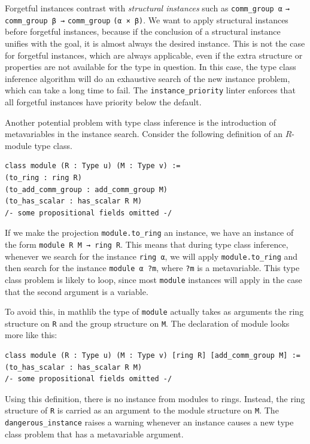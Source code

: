 \documentclass[runningheads]{llncs}
\newcommand{\mathlib}{\textsf{mathlib}\xspace}
\newcommand{\lean}[1]{\lstinline[language=lean]{#1}}
\begin{document}
Forgetful instances contrast with \emph{structural instances}
such as \lstinline{comm_group α} \lstinline{→} \lstinline{comm_group β →} \lstinline{comm_group} \lstinline{(α × β)}. %
We want to apply structural instances before forgetful instances,
because if the conclusion of a structural instance unifies with the goal,
it is almost always the desired instance.
This is not the case for forgetful instances,
which are always applicable,
even if the extra structure or properties are not available for the type in question.
In this case, the type class inference algorithm will do an exhaustive search
of the new instance problem, which can take a long time to fail.
The \lean{instance_priority} linter
enforces that all forgetful instances have priority below the default.

Another potential problem with type class inference
is the introduction of metavariables in the instance search.
Consider the following definition of an $R$-module type class.
\begin{lstlisting}
class module (R : Type u) (M : Type v) :=
(to_ring : ring R)
(to_add_comm_group : add_comm_group M)
(to_has_scalar : has_scalar R M)
/- some propositional fields omitted -/
\end{lstlisting}
If we make the projection \lean{module.to_ring} an instance,
we have an instance of the form \lstinline{module R M → ring R}.
This means that during type class inference,
whenever we search for the instance \lstinline{ring α},
we will apply \lean{module.to_ring}
and then search for the instance \lstinline{module α ?m}, where \lean{?m} is a metavariable.
This type class problem is likely to loop,
since most \lean{module} instances will apply in the case that the second argument is a variable.

To avoid this,
in \mathlib the type of \lean{module} actually takes as arguments
the ring structure on \lean{R} and the group structure on \lean{M}.
The declaration of module looks more like this:
\begin{lstlisting}
class module (R : Type u) (M : Type v) [ring R] [add_comm_group M] :=
(to_has_scalar : has_scalar R M)
/- some propositional fields omitted -/
\end{lstlisting}
Using this definition, there is no instance from modules to rings.
Instead, the ring structure of \lean{R} is carried as an argument
to the module structure on \lean{M}.
The \lean{dangerous_instance} raises a warning
whenever an instance causes a new type class problem
that has a metavariable argument.
\end{document}
